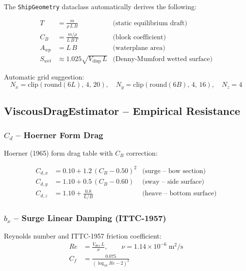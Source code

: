 \documentclass[12pt,a4paper]{article}
\begin{document}
The \texttt{ShipGeometry} dataclass automatically derives the following:

\begin{align}
  T &= \frac{m}{\rho\,L\,B}
  &\text{(static equilibrium draft)} \label{eq:draft_calc}\\[4pt]
  C_B &= \frac{m/\rho}{L\,B\,T}
  &\text{(block coefficient)} \label{eq:cb_calc}\\[4pt]
  A_{wp} &= L\,B
  &\text{(waterplane area)} \label{eq:awp_calc}\\[4pt]
  S_{wet} &\approx 1.025\sqrt{V_{\text{disp}}\,L}
  &\text{(Denny-Mumford wetted surface)} \label{eq:swet_calc}
\end{align}

Automatic grid suggestion:
\begin{equation}
  N_x = \mathrm{clip}(\mathrm{round}(6L),\,4,\,20),\quad
  N_y = \mathrm{clip}(\mathrm{round}(6B),\,4,\,16),\quad
  N_z = 4
  \label{eq:grid_suggest}
\end{equation}

\subsection{ViscousDragEstimator -- Empirical Resistance}

\subsubsection{$C_d$ -- Hoerner Form Drag}

Hoerner (1965) form drag table with $C_B$ correction:

\begin{align}
  C_{d,x} &= 0.10 + 1.2\,(C_B - 0.50)^2
  &\text{(surge -- bow section)} \label{eq:cdx}\\[4pt]
  C_{d,y} &= 1.10 + 0.5\,(C_B - 0.60)
  &\text{(sway -- side surface)} \label{eq:cdy}\\[4pt]
  C_{d,z} &= 1.10 + \frac{0.8}{L/B}
  &\text{(heave -- bottom surface)} \label{eq:cdz}
\end{align}

\subsubsection{$b_x$ -- Surge Linear Damping (ITTC-1957)}

Reynolds number and ITTC-1957 friction coefficient:
\begin{align}
  Re &= \frac{V_{des}\,L}{\nu}, \qquad \nu = 1.14\times10^{-6}\;\text{m}^2/\text{s}
  \label{eq:re}\\[4pt]
  C_f &= \frac{0.075}{(\log_{10} Re - 2)^2}
  \label{eq:cf}
\end{align}
\end{document}
